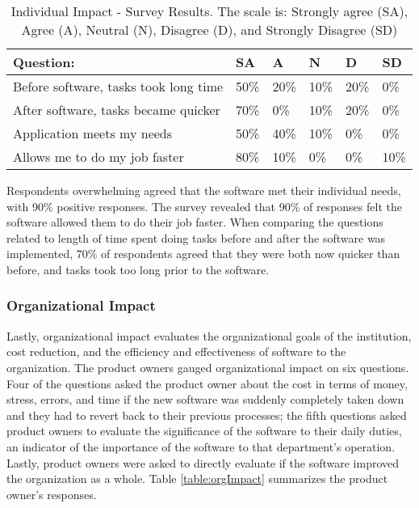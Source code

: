 \begin{table}
\caption{Individual Impact - Survey Results. The scale is: Strongly agree (SA), Agree (A), Neutral (N), Disagree (D), and Strongly Disagree (SD)}
\label{table:individualImpact}
\begin{tabular}{p{4.3cm}p{.4cm}p{.4cm}p{.4cm}p{.4cm}p{.4cm}}
Question: & SA & A & N & D & SD \\
\hline
Before software, tasks took long time & 50\% & 20\% & 10\% & 20\% & 0\% \\
After software, tasks became quicker & 70\% & 0\% & 10\% & 20\% & 0\% \\
Application meets my needs & 50\% & 40\% & 10\% & 0\% & 0\% \\
Allows me to do my job faster & 80\% & 10\% & 0\% & 0\% & 10\% \\
\end{tabular}
\end{table}

Respondents overwhelming agreed that the software met their individual needs, with 90\% positive responses. The survey revealed that 90\% of responses felt the software allowed them to do their job faster. When comparing the questions related to length of time spent doing tasks before and after the software was implemented, 70\% of respondents agreed that they were both now quicker than before, and tasks took too long prior to the software. %


\subsubsection{Organizational Impact}
Lastly, organizational impact evaluates the organizational goals of the institution, cost reduction, and the efficiency and effectiveness of software to the organization. The product owners gauged organizational impact on six questions. Four of the questions asked the product owner about the cost in terms of money, stress, errors, and time if the new software was suddenly completely taken down and they had to revert back to their previous processes; the fifth questions asked product owners to evaluate the significance of the software to their daily duties, an indicator of the importance of the software to that department's operation. Lastly, product owners were asked to directly evaluate if the software improved the organization as a whole. Table \ref{table:orgImpact} summarizes the product owner's responses.

